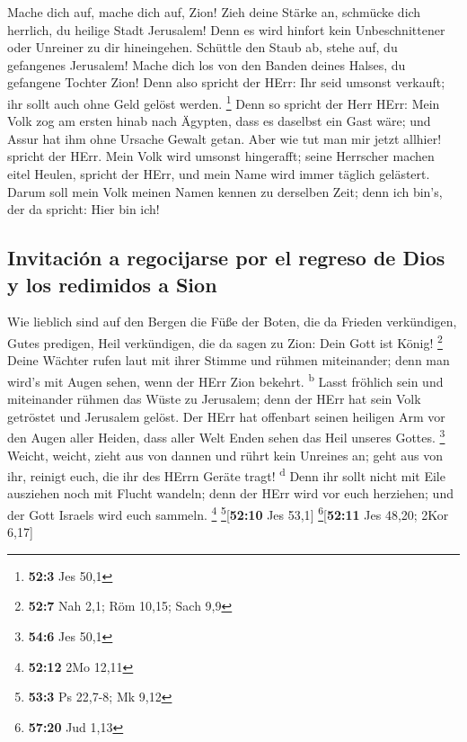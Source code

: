  Mache dich auf, mache dich auf, Zion! Zieh deine Stärke
an, schmücke dich herrlich, du heilige Stadt Jerusalem! Denn es wird
hinfort kein Unbeschnittener oder Unreiner zu dir hineingehen.
 Schüttle den Staub ab, stehe auf, du gefangenes
Jerusalem! Mache dich los von den Banden deines Halses, du gefangene
Tochter Zion!  Denn also spricht der HErr: Ihr seid
umsonst verkauft; ihr sollt auch ohne Geld gelöst werden. \footnote{\textbf{52:3}
  Jes 50,1}  Denn so spricht der Herr HErr: Mein Volk zog
am ersten hinab nach Ägypten, dass es daselbst ein Gast wäre; und Assur
hat ihm ohne Ursache Gewalt getan.  Aber wie tut man mir
jetzt allhier! spricht der HErr. Mein Volk wird umsonst hingerafft;
seine Herrscher machen eitel Heulen, spricht der HErr, und mein Name
wird immer täglich gelästert.  Darum soll mein Volk meinen
Namen kennen zu derselben Zeit; denn ich bin's, der da spricht: Hier bin
ich!

\hypertarget{invitaciuxf3n-a-regocijarse-por-el-regreso-de-dios-y-los-redimidos-a-sion}{%
\subsection{Invitación a regocijarse por el regreso de Dios y los
redimidos a
Sion}\label{invitaciuxf3n-a-regocijarse-por-el-regreso-de-dios-y-los-redimidos-a-sion}}

 Wie lieblich sind auf den Bergen die Füße der Boten, die
da Frieden verkündigen, Gutes predigen, Heil verkündigen, die da sagen
zu Zion: Dein Gott ist König! \footnote{\textbf{52:7} Nah 2,1; Röm
  10,15; Sach 9,9}  Deine Wächter rufen laut mit ihrer
Stimme und rühmen miteinander; denn man wird's mit Augen sehen, wenn der
HErr Zion bekehrt. \textsuperscript{b}  Lasst fröhlich
sein und miteinander rühmen das Wüste zu Jerusalem; denn der HErr hat
sein Volk getröstet und Jerusalem gelöst.  Der HErr hat
offenbart seinen heiligen Arm vor den Augen aller Heiden, dass aller
Welt Enden sehen das Heil unseres Gottes. \footnote{\textbf{54:6} Jes
  50,1}  Weicht, weicht, zieht aus von dannen und rührt
kein Unreines an; geht aus von ihr, reinigt euch, die ihr des HErrn
Geräte tragt! \textsuperscript{d}  Denn ihr sollt nicht
mit Eile ausziehen noch mit Flucht wandeln; denn der HErr wird vor euch
herziehen; und der Gott Israels wird euch sammeln. \footnote{\textbf{52:12}
  2Mo 12,11} \footnote{\textbf{53:3} Ps 22,7-8; Mk 9,12}{[}\textbf{52:10}
Jes 53,1{]} \footnote{\textbf{57:20} Jud 1,13}{[}\textbf{52:11} Jes
48,20; 2Kor 6,17{]}


